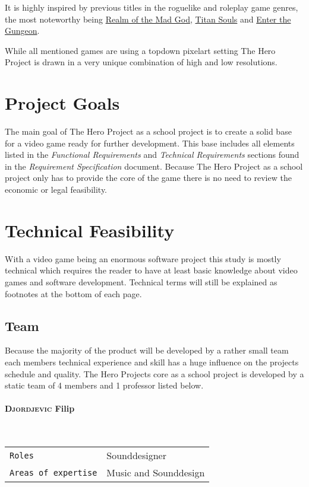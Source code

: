 \documentclass[11pt]{article}
\begin{document}
It is highly inspired by previous titles in the roguelike and roleplay game genres, the most noteworthy being \href{https://realmofthemadgod.com}{Realm of the Mad God}, \href{http://www.devolverdigital.com/games/view/titan-souls}{Titan Souls} and \href{http://dodgeroll.com/gungeon/}{Enter the Gungeon}.

While all mentioned games are using a topdown pixelart setting The Hero Project is drawn in a very unique combination of high and low resolutions.

\section{Project Goals}
The main goal of The Hero Project as a school project is to create a solid base for a video game ready for further development.
This base includes all elements listed in the \textit{Functional Requirements} and \textit{Technical Requirements} sections found in the \textit{Requirement Specification} document.
Because The Hero Project as a school project only has to provide the core of the game there is no need to review the economic or legal feasibility.

\newpage

\section{Technical Feasibility}
With a video game being an enormous software project this study is mostly technical which requires the reader to have at least basic knowledge about video games and software development.
Technical terms will still be explained as footnotes at the bottom of each page.

\subsection{Team}
Because the majority of the product will be developed by a rather small team each members technical experience and skill has a huge influence on the projects schedule and quality.
The Hero Projects core as a school project is developed by a static team of 4 members and 1 professor listed below.
\paragraph{\textsc{Djordjevic} Filip} ~\\
\begin{tabular}{ll}
\texttt{Roles} & Sounddesigner\\
\texttt{Areas of expertise} & Music and Sounddesign
\end{tabular}
\end{document}
